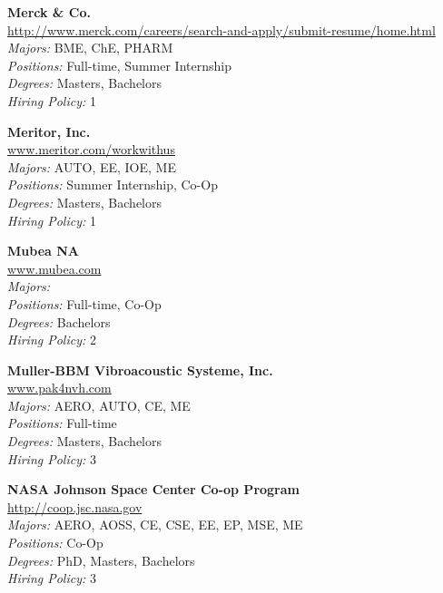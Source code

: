 \documentclass[twoside]{article}
\begin{document}
\begin{center}
\begin{multicols}{3}
\begin{minipage}{.9\columnwidth}{\Large\bf Merck \& Co. }\\
	\url{http://www.merck.com/careers/search-and-apply/submit-resume/home.html}\\
	\emph{Majors:} BME, ChE, PHARM\\
	\emph{Positions:} Full-time, Summer Internship\\
	\emph{Degrees:} Masters, Bachelors\\
	\emph{Hiring Policy:} 1\\
\end{minipage}
 
\begin{minipage}{.9\columnwidth}{\Large\bf Meritor, Inc. }\\
	\url{www.meritor.com/workwithus}\\
	\emph{Majors:} AUTO, EE, IOE, ME\\
	\emph{Positions:} Summer Internship, Co-Op\\
	\emph{Degrees:} Masters, Bachelors\\
	\emph{Hiring Policy:} 1\\
\end{minipage}
 
\begin{minipage}{.9\columnwidth}{\Large\bf Mubea NA }\\
	\url{www.mubea.com}\\
	\emph{Majors:} \\
	\emph{Positions:} Full-time, Co-Op\\
	\emph{Degrees:} Bachelors\\
	\emph{Hiring Policy:} 2\\
\end{minipage}
 
\begin{minipage}{.9\columnwidth}{\Large\bf Muller-BBM Vibroacoustic Systeme, Inc. }\\
	\url{www.pak4nvh.com}\\
	\emph{Majors:} AERO, AUTO, CE, ME\\
	\emph{Positions:} Full-time\\
	\emph{Degrees:} Masters, Bachelors\\
	\emph{Hiring Policy:} 3\\
\end{minipage}
 
\begin{minipage}{.9\columnwidth}{\Large\bf NASA Johnson Space Center Co-op Program }\\
	\url{http://coop.jsc.nasa.gov}\\
	\emph{Majors:} AERO, AOSS, CE, CSE, EE, EP, MSE, ME\\
	\emph{Positions:} Co-Op\\
	\emph{Degrees:} PhD, Masters, Bachelors\\
	\emph{Hiring Policy:} 3\\
\end{minipage}
 

\end{multicols}
\end{center}
\end{document}
